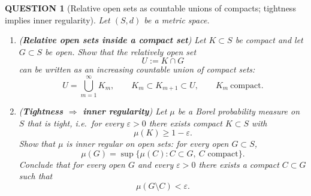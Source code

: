 \documentclass[12pt]{article}
\renewcommand{\(}{\left(}%
\renewcommand{\)}{\right)}%
\renewcommand{\[}{\left[}%
\renewcommand{\]}{\right]}%
\newtheorem{question}{QUESTION}[section]}
\begin{document}
\begin{question}[Relative open sets as countable unions of compacts; tightness implies inner regularity]
Let $(S,d)$ be a metric space.

\begin{enumerate}
\item (\textbf{Relative open sets inside a compact set})  
Let $K\subset S$ be compact and let $G\subset S$ be open. Show that the relatively open set
\begin{equation*}
U := K\cap G
\end{equation*}
can be written as an increasing countable union of compact sets:
\begin{equation*}
U=\bigcup_{m=1}^\infty K_m,
\qquad
K_m\subset K_{m+1}\subset U,
\qquad
K_m \ \text{compact}.
\end{equation*}

\item (\textbf{Tightness $\Rightarrow$ inner regularity})  
Let $\mu$ be a Borel probability measure on $S$ that is tight, i.e.\ for every $\varepsilon>0$ there
exists compact $K\subset S$ with
\begin{equation*}
\mu(K)\ge 1-\varepsilon.
\end{equation*}
Show that $\mu$ is inner regular on open sets: for every open $G\subset S$,
\begin{equation*}
\mu(G)=\sup\{\mu(C): C\subset G,\ C \text{ compact}\}.
\end{equation*}
Conclude that for every open $G$ and every $\varepsilon>0$ there exists a compact $C\subset G$ such that
\begin{equation*}
\mu(G\setminus C)<\varepsilon.
\end{equation*}
\end{enumerate}
\end{question}
\end{document}
